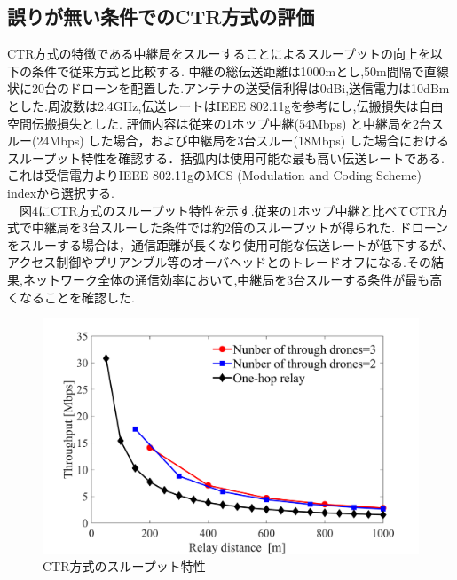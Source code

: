 \documentclass[a4paper,10pt]{ltjsarticle}
\begin{document}
\subsection{誤りが無い条件でのCTR方式の評価}
CTR方式の特徴である中継局をスルーすることによるスループットの向上を以下の条件で従来方式と比較する.
中継の総伝送距離は1000mとし,50m間隔で直線状に20台のドローンを配置した.アンテナの送受信利得は0dBi,送信電力は10dBmとした.周波数は2.4GHz,伝送レートはIEEE 802.11gを参考にし,伝搬損失は自由空間伝搬損失とした.
評価内容は従来の1ホップ中継(54Mbps) と中継局を2台スルー(24Mbps) した場合，および中継局を3台スルー(18Mbps) した場合におけるスループット特性を確認する．括弧内は使用可能な最も高い伝送レートである.これは受信電力よりIEEE 802.11gのMCS (Modulation and Coding Scheme) indexから選択する.
\\　図4にCTR方式のスループット特性を示す.従来の1ホップ中継と比べてCTR方式で中継局を3台スルーした条件では約2倍のスループットが得られた.
ドローンをスルーする場合は，通信距離が長くなり使用可能な伝送レートが低下するが、アクセス制御やプリアンブル等のオーバヘッドとのトレードオフになる.その結果,ネットワーク全体の通信効率において,中継局を3台スルーする条件が最も高くなることを確認した.
\begin{figure}[H]
  \centering
  \includegraphics[width=\linewidth]{throughtput_vs_placement_50m_max_distance_3.pdf} %
  \caption{CTR方式のスループット特性}
  \label{fig:throughput_through} %
\end{figure}
\end{document}
